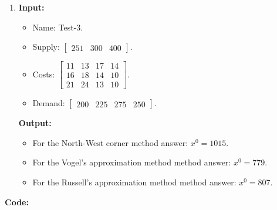 \documentclass{article}
\begin{document}
\begin{enumerate}[label={(\arabic*)}, itemsep=0.25in]
\item \textbf{Input:}
\begin{itemize}
\item Name: Test-3.
\item Supply: \(\begin{bmatrix} 251 & 300 & 400 \end{bmatrix}\).
\item Costs: \(\begin{bmatrix}
11 & 13 & 17 & 14 \\
16 & 18 & 14 & 10 \\
21 & 24 & 13 & 10
\end{bmatrix}\).
\item Demand: \(\begin{bmatrix} 200 & 225 & 275 & 250 \end{bmatrix}\).
\end{itemize}
\textbf{Output:}
\begin{itemize}
\item For the North-West corner method answer: \(x^0 = 1015\).
\item For the Vogel’s approximation method method answer: \(x^0 = 779\).
\item For the Russell’s approximation method method answer: \(x^0 = 807\).
\end{itemize}
\end{enumerate}

\newpage

\textbf{Code:}


\newpage


\newpage


\newpage


\newpage

\end{document}

